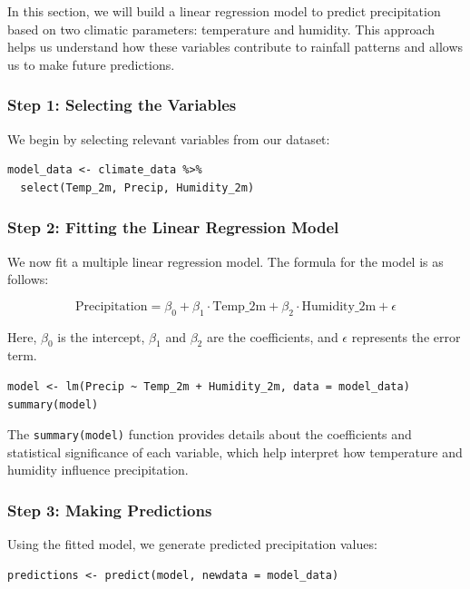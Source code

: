 In this section, we will build a linear regression model to predict precipitation based on two climatic parameters: temperature and humidity. This approach helps us understand how these variables contribute to rainfall patterns and allows us to make future predictions.

\subsubsection*{Step 1: Selecting the Variables}

We begin by selecting relevant variables from our dataset:

\begin{verbatim}
model_data <- climate_data %>%
  select(Temp_2m, Precip, Humidity_2m)
\end{verbatim}

\subsubsection*{Step 2: Fitting the Linear Regression Model}

We now fit a multiple linear regression model. The formula for the model is as follows:

\[
\text{Precipitation} = \beta_0 + \beta_1 \cdot \text{Temp\_2m} + \beta_2 \cdot \text{Humidity\_2m} + \epsilon
\]

Here, \(\beta_0\) is the intercept, \(\beta_1\) and \(\beta_2\) are the coefficients, and \(\epsilon\) represents the error term.

\begin{verbatim}
model <- lm(Precip ~ Temp_2m + Humidity_2m, data = model_data)
summary(model)
\end{verbatim}

The \texttt{summary(model)} function provides details about the coefficients and statistical significance of each variable, which help interpret how temperature and humidity influence precipitation.

\subsubsection*{Step 3: Making Predictions}

Using the fitted model, we generate predicted precipitation values:

\begin{verbatim}
predictions <- predict(model, newdata = model_data)
\end{verbatim}

